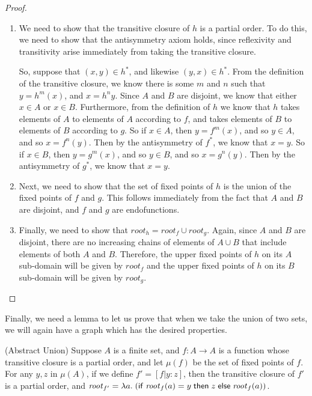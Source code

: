 \begin{proof}
\begin{enumerate}
\item We need to show that the transitive closure of $h$ is a partial
order. To do this, we need to show that the antisymmetry axiom holds, 
since reflexivity and transitivity arise immediately from taking the
transitive closure. 

So, suppose that $(x,y) \in h^{*}$, and likewise $(y, x) \in
h^{*}$. From the definition of the transitive closure, we know there
is some $m$ and $n$ such that $y = h^m(x)$, and $x = h^n{y}$.  Since
$A$ and $B$ are disjoint, we know that either $x \in A$ or $x \in
B$. Furthermore, from the definition of $h$ we know that $h$ takes
elements of $A$ to elements of $A$ according to $f$, and takes
elements of $B$ to elements of $B$ according to $g$. So if $x \in A$,
then $y = f^m(x)$, and so $y \in A$, and so $x = f^n(y)$.  Then by the
antisymmetry of $f^{*}$, we know that $x = y$. So if $x \in B$, then
$y = g^m(x)$, and so $y \in B$, and so $x = g^n(y)$.  Then by the
antisymmetry of $g^{*}$, we know that $x = y$.

\item Next, we need to show that the set of fixed points of $h$ is the
  union of the fixed points of $f$ and $g$. This follows immediately
  from the fact that $A$ and $B$ are disjoint, and $f$ and $g$ are
  endofunctions.

\item Finally, we need to show that $\mathit{root}_h = \mathit{root}_f
  \cup \mathit{root}_g$. Again, since $A$ and $B$ are disjoint, there
  are no increasing chains of elements of $A \cup B$ that include
  elements of both $A$ and $B$.  Therefore, the upper fixed points of
  $h$ on its $A$ sub-domain will be given by $\mathit{root}_f$ and the
  upper fixed points of $h$ on its $B$ sub-domain will be given by
  $\mathit{root}_g$.
\end{enumerate}
\end{proof}

Finally, we need a lemma to let us prove that when we take the union
of two sets, we will again have a graph which has the desired properties.

\begin{lemma}{(Abstract Union)}
Suppose $A$ is a finite set, and $f : A \to A$ is a function whose
transitive closure is a partial order, and let $\mu(f)$ be the set of
fixed points of $f$. For any $y, z$ in $\mu(A)$, if we define $f' =
[f|y:z]$, then the transitive closure of $f'$ is a partial order, and 
$\mathit{root}_{f'} = \lambda a.\;(\mathsf{if}\;{\mathit{root}_f(a)=y}\;\mathsf{then}\;{z}\;\mathsf{else}\;{\mathit{root}_f(a)})$.
\end{lemma}

